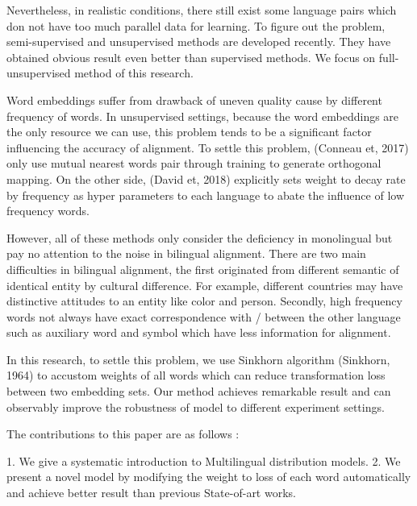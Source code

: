 	Nevertheless, in realistic conditions, there still exist some language pairs which don not have too much parallel data for learning. To figure out the problem, semi-supervised and unsupervised methods are developed recently. They have obtained obvious result even better than supervised methods. We focus on full-unsupervised method of this research. 

	Word embeddings suffer from drawback of uneven quality cause by different frequency of words. In unsupervised settings, because the word embeddings are the only resource we can use, this problem tends to be a significant factor influencing the accuracy of alignment. To settle this problem, (Conneau et, 2017) only use mutual nearest words pair through training to generate orthogonal mapping. On the other side, (David et, 2018) explicitly sets weight to decay rate by frequency as hyper parameters to each language to abate the influence of low frequency words. 

	However, all of these methods only consider the deficiency in monolingual but pay no attention to the noise in bilingual alignment. There are two main difficulties in bilingual alignment, the first originated from different semantic of identical entity by cultural difference. For example, different countries may have distinctive attitudes to an entity like color and person. Secondly, high frequency words not always have exact correspondence with / between the other language such as auxiliary word and symbol which have less information for alignment. 

	In this research, to settle this problem, we use Sinkhorn algorithm (Sinkhorn, 1964) to accustom weights of all words which can reduce transformation loss between two embedding sets. Our method achieves remarkable result and can observably improve the robustness of model to different experiment settings.

	The contributions to this paper are as follows :

	1. We give a systematic introduction to Multilingual distribution models. 
	2. We present a novel model by modifying the weight to loss of each word automatically and achieve better result than previous State-of-art works.  



